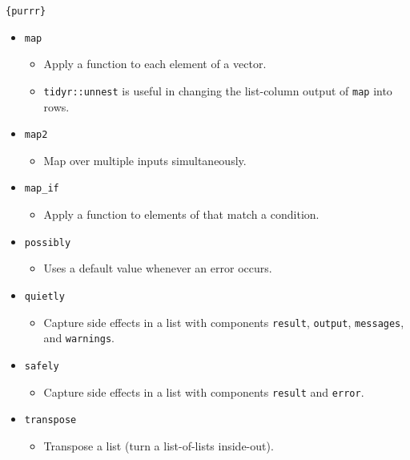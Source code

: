 \documentclass[
]{book}
\providecommand{\tightlist}{%
  \setlength{\itemsep}{0pt}\setlength{\parskip}{0pt}}
\begin{document}
\texttt{\{purrr\}}

\begin{itemize}
\tightlist
\item
  \texttt{map}

  \begin{itemize}
  \tightlist
  \item
    Apply a function to each element of a vector.
  \item
    \texttt{tidyr::unnest} is useful in changing the list-column output of \texttt{map} into rows.
  \end{itemize}
\item
  \texttt{map2}

  \begin{itemize}
  \tightlist
  \item
    Map over multiple inputs simultaneously.
  \end{itemize}
\item
  \texttt{map\_if}

  \begin{itemize}
  \tightlist
  \item
    Apply a function to elements of that match a condition.
  \end{itemize}
\item
  \texttt{possibly}

  \begin{itemize}
  \tightlist
  \item
    Uses a default value whenever an error occurs.
  \end{itemize}
\item
  \texttt{quietly}

  \begin{itemize}
  \tightlist
  \item
    Capture side effects in a list with components \texttt{result}, \texttt{output}, \texttt{messages}, and \texttt{warnings}.
  \end{itemize}
\item
  \texttt{safely}

  \begin{itemize}
  \tightlist
  \item
    Capture side effects in a list with components \texttt{result} and \texttt{error}.
  \end{itemize}
\item
  \texttt{transpose}

  \begin{itemize}
  \tightlist
  \item
    Transpose a list (turn a list-of-lists inside-out).
  \end{itemize}
\end{itemize}
\end{document}
